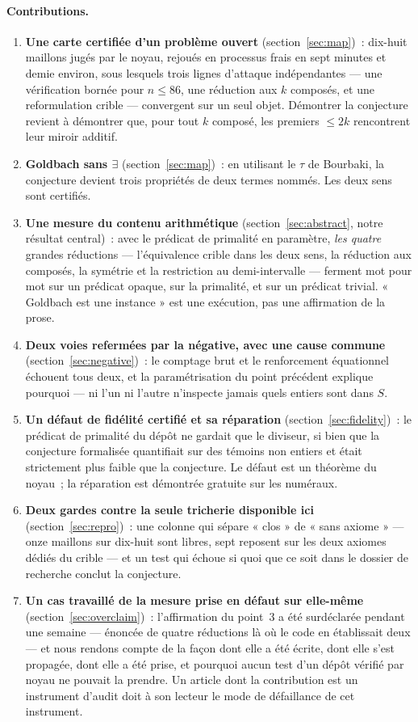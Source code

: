 \documentclass[11pt]{article}
\theoremstyle{remark}\newtheorem{remarque}{Remarque}
\begin{document}
\paragraph{Contributions.}
\begin{enumerate}\itemsep2pt
\item \textbf{Une carte certifiée d'un problème ouvert} (section~\ref{sec:map})~:
dix-huit maillons jugés par le noyau, rejoués en processus frais en sept minutes et
demie environ, sous lesquels trois lignes d'attaque indépendantes --- une vérification
bornée pour $n \le 86$, une réduction aux $k$ composés, et une reformulation crible ---
convergent sur un seul objet. Démontrer la conjecture revient à démontrer que, pour tout
$k$ composé, les premiers $\le 2k$ rencontrent leur miroir additif.
\item \textbf{Goldbach sans $\exists$} (section~\ref{sec:map})~: en utilisant le $\tau$
de Bourbaki, la conjecture devient trois propriétés de deux termes nommés. Les deux sens
sont certifiés.
\item \textbf{Une mesure du contenu arithmétique} (section~\ref{sec:abstract}, notre
résultat central)~: avec le prédicat de primalité en paramètre, \emph{les quatre} grandes
réductions --- l'équivalence crible dans les deux sens, la réduction aux composés, la
symétrie et la restriction au demi-intervalle --- ferment mot pour mot sur un prédicat
opaque, sur la primalité, et sur un prédicat trivial. « Goldbach est une instance » est
une exécution, pas une affirmation de la prose.
\item \textbf{Deux voies refermées par la négative, avec une cause commune}
(section~\ref{sec:negative})~: le comptage brut et le renforcement équationnel échouent
tous deux, et la paramétrisation du point précédent explique pourquoi --- ni l'un ni
l'autre n'inspecte jamais quels entiers sont dans $S$.
\item \textbf{Un défaut de fidélité certifié et sa réparation}
(section~\ref{sec:fidelity})~: le prédicat de primalité du dépôt ne gardait que le
diviseur, si bien que la conjecture formalisée quantifiait sur des témoins non entiers et
était strictement plus faible que la conjecture. Le défaut est un théorème du noyau~; la
réparation est démontrée gratuite sur les numéraux.
\item \textbf{Deux gardes contre la seule tricherie disponible ici}
(section~\ref{sec:repro})~: une colonne qui sépare « clos » de « sans axiome » --- onze
maillons sur dix-huit sont libres, sept reposent sur les deux axiomes dédiés du crible
--- et un test qui échoue si quoi que ce soit dans le dossier de recherche conclut la
conjecture.
\item \textbf{Un cas travaillé de la mesure prise en défaut sur elle-même}
(section~\ref{sec:overclaim})~: l'affirmation du point~3 a été surdéclarée pendant une
semaine --- énoncée de quatre réductions là où le code en établissait deux --- et nous
rendons compte de la façon dont elle a été écrite, dont elle s'est propagée, dont elle a
été prise, et pourquoi aucun test d'un dépôt vérifié par noyau ne pouvait la prendre. Un
article dont la contribution est un instrument d'audit doit à son lecteur le mode de
défaillance de cet instrument.
\end{enumerate}
\end{document}

